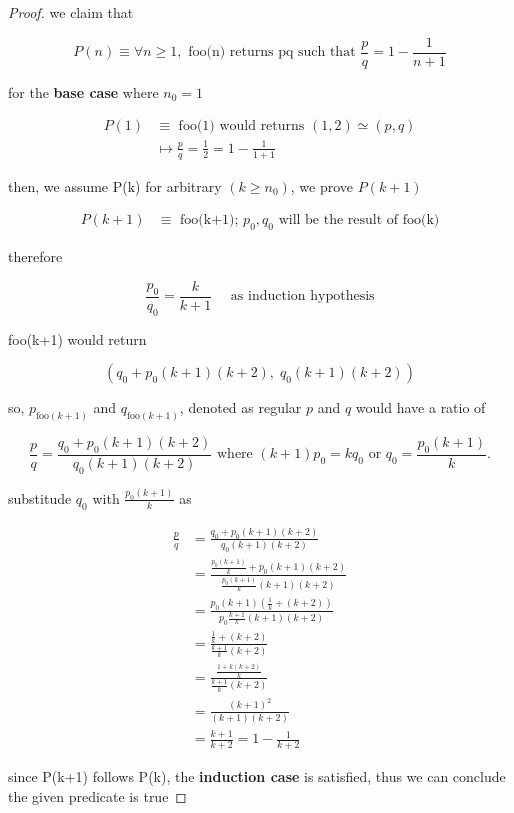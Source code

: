 \documentclass{article}
\theoremstyle{remark}
\begin{document}
\begin{proof}

    we claim that

    \[
        P(n) \equiv \forall n \ge 1, \text{ foo(n) returns pq such that } \frac{p}{q} = 1 - \frac{1}{n+1}
    \]

    for the \textbf{base case} where $n_0 = 1$

    \begin{align*}
        P(1) &\equiv \text{ foo(1) would returns } (1, 2) \simeq (p, q) \\
        &\mapsto \frac{p}{q} = \frac{1}{2} = 1 - \frac{1}{1+1}
    \end{align*}

    then, we assume P(k) for arbitrary $(k \ge n_0)$, we prove $P(k+1)$

    \begin{align*}
        P(k+1) &\equiv \text{ foo(k+1)} \text{; $p_0, q_0$ will be the result of foo(k)}
    \end{align*}

    therefore 

    \[
    \frac{p_0}{q_0} = \frac{k}{k+1} \quad \text{ as induction hypothesis}
    \]

    foo(k+1) would return

    \[
    (q_0 + p_0(k+1)(k+2), \; q_0 (k+1)(k+2))
    \]

    so, $p_{\text{foo}(k+1)}$ and $q_{\text{foo}(k+1)}$, denoted as regular $p$ and $q$ would have a ratio of

    \[
    \frac{p}{q}
    =
    \frac{q_0 + p_0 (k+1)(k+2)}
         {q_0 (k+1)(k+2)}
    \text{ where }
    (k+1)p_0 = k q_0
    \text{ or }
    q_0 = \frac{p_0 (k+1)}{k}.
    \]    

    substitude $q_0$ with $\frac{p_0(k+1)}{k}$ as

    \begin{align*}
    \frac{p}{q}
    &= \frac{q_0+p_0(k+1)(k+2)}{q_0 (k+1)(k+2)} \\
    &= \frac{\frac{p_0(k+1)}{k}+p_0(k+1)(k+2)}{\frac{p_0(k+1)}{k}(k+1)(k+2)} \\
    &= \frac{p_0(k+1)\left(\frac{1}{k}+ (k+2)\right)}{p_0\frac{k+1}{k}(k+1)(k+2)} \\
    &= \frac{\frac{1}{k}+ (k+2)}{\frac{k+1}{k}(k+2)} \\
    &= \frac{\frac{1+k(k+2)}{k}}{\frac{k+1}{k}(k+2)} \\
    &= \frac{(k+1)^2}{(k+1)(k+2)} \\
    &= \frac{k+1}{k+2} = 1-\frac{1}{k+2}
    \end{align*}

    since P(k+1) follows P(k), the \textbf{induction case} is satisfied, thus we can conclude the given predicate is true

\end{proof}
\end{document}
